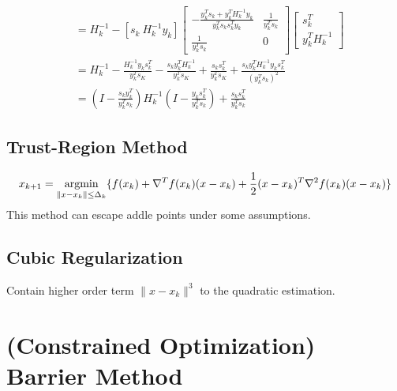 \documentclass[11pt]{elegantbook}
\newcommand{\argmin}{\operatornamewithlimits{argmin}}
\begin{document}
\begin{equation}
\begin{aligned}
        &=H_k^{-1}-[s_k\ H_k^{-1}y_k]\begin{bmatrix}
            -\frac{y_k^Ts_k+y^T_kH_k^{-1}y_k}{y_k^Ts_ks_k^Ty_k}&\frac{1}{y_k^Ts_k}\\
            \frac{1}{y_k^Ts_k}&0
        \end{bmatrix}\begin{bmatrix}
            s_k^T\\
            y_k^TH_k^{-1}
        \end{bmatrix}\\
        &=H_k^{-1}-\frac{H_k^{-1}y_ks^T_k}{y_k^Ts_K}-\frac{s_ky^T_kH_k^{-1}}{y_k^Ts_K}+\frac{s_ks_k^T}{y_k^Ts_K}+\frac{s_ky_k^TH_k^{-1}y_ks_k^T}{(y_k^Ts_k)^2}\\
        &=\left(I-\frac{s_ky_k^T}{y^T_ks_k}\right)H_k^{-1}\left(I-\frac{y_ks_k^T}{y^T_ks_k}\right)+\frac{s_ks_k^T}{y^T_ks_k}
    \end{aligned}
    \nonumber
\end{equation}
\begin{center}
\end{center}

\section{Trust-Region Method}
\begin{equation}
    \begin{aligned}
        x_{k+1}=\argmin_{\|x-x_k\|\leq\Delta_k}\{f(x_k)+\nabla^T f(x_k)(x-x_k)+\frac{1}{2}(x-x_k)^T \nabla^2 f(x_k) (x-x_k)\}
    \end{aligned}
    \nonumber
\end{equation}
This method can escape addle points under some assumptions.

\section{Cubic Regularization}
Contain higher order term $\|x-x_k\|^3$ to the quadratic estimation.


\chapter{(Constrained Optimization) Barrier Method}
\end{document}
